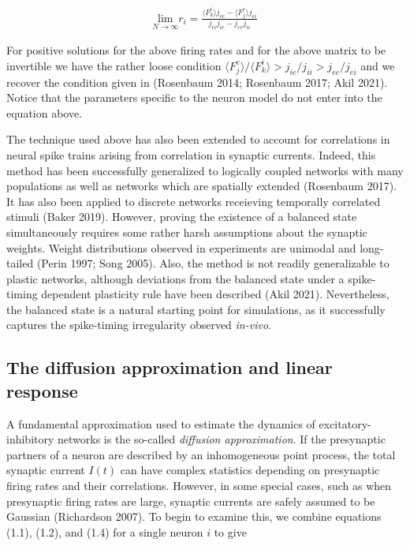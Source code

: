 \documentclass{ucetd}
\begin{document}
\begin{align}
\underset{N\rightarrow \infty}{\mathrm{lim}}r_{i} = \frac{\langle F_{k}^{i}\rangle j_{ee}-\langle F_{j}^{e}\rangle j_{ei}}{j_{ei}j_{ie} - j_{ee}j_{ii}}
\end{align}

For positive solutions for the above firing rates and for the above matrix to be invertible we have the rather loose condition $\langle F_{j}^{e}\rangle/\langle F_{k}^{i}\rangle > j_{ie}/j_{ii} > j_{ee}/j_{ei}$ and we recover the condition given in (Rosenbaum 2014; Rosenbaum 2017; Akil 2021). Notice that the parameters specific to the neuron model do not enter into the equation above. 

The technique used above has also been extended to account for correlations in neural spike trains arising from correlation in synaptic currents. Indeed, this method has been successfully generalized to logically coupled networks with many populations as well as networks which are spatially extended (Rosenbaum 2017). It has also been applied to discrete networks receieving temporally correlated stimuli (Baker 2019). However, proving the existence of a balanced state simultaneously requires some rather harsh assumptions about the synaptic weights. Weight distributions observed in experiments are unimodal and long-tailed (Perin 1997; Song 2005). Also, the method is not readily generalizable to plastic networks, although deviations from the balanced state under a spike-timing dependent plasticity rule have been described (Akil 2021). Nevertheless, the balanced state is a natural starting point for simulations, as it successfully captures the spike-timing irregularity observed \emph{in-vivo}.

\subsection{The diffusion approximation and linear response}


A fundamental approximation used to estimate the dynamics of excitatory-inhibitory networks is the so-called \emph{diffusion approximation}. If the presynaptic partners of a neuron are described by an inhomogeneous point process, the total synaptic current $I(t)$ can have complex statistics depending on presynaptic firing rates and their correlations. However, in some special cases, such as when presynaptic firing rates are large, synaptic currents are safely assumed to be Gaussian (Richardson 2007). To begin to examine this, we combine equations (1.1), (1.2), and (1.4) for a single neuron $i$ to give 
\end{document}
